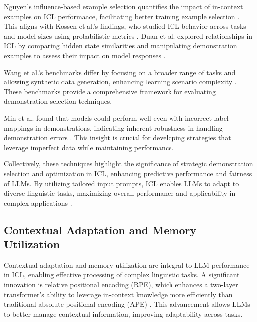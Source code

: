 Nguyen's influence-based example selection quantifies the impact of in-context examples on ICL performance, facilitating better training example selection \cite{nguyen2023incontextexampleselectioninfluences}. This aligns with Kossen et al.'s findings, who studied ICL behavior across tasks and model sizes using probabilistic metrics \cite{kossen2024incontextlearninglearnslabel}. Duan et al. explored relationships in ICL by comparing hidden state similarities and manipulating demonstration examples to assess their impact on model responses \cite{duan2023exploringrelationshipincontextlearning}.

Wang et al.'s benchmarks differ by focusing on a broader range of tasks and allowing synthetic data generation, enhancing learning scenario complexity \cite{wang2024benchmarkinggeneralpurposeincontextlearning}. These benchmarks provide a comprehensive framework for evaluating demonstration selection techniques.

Min et al. found that models could perform well even with incorrect label mappings in demonstrations, indicating inherent robustness in handling demonstration errors \cite{min2022rethinkingroledemonstrationsmakes}. This insight is crucial for developing strategies that leverage imperfect data while maintaining performance.

Collectively, these techniques highlight the significance of strategic demonstration selection and optimization in ICL, enhancing predictive performance and fairness of LLMs. By utilizing tailored input prompts, ICL enables LLMs to adapt to diverse linguistic tasks, maximizing overall performance and applicability in complex applications \cite{peng2024revisitingdemonstrationselectionstrategies,hu2024strategicdemonstrationselectionimproved}.


\subsection{Contextual Adaptation and Memory Utilization} \label{subsec:Contextual Adaptation and Memory Utilization}

Contextual adaptation and memory utilization are integral to LLM performance in ICL, enabling effective processing of complex linguistic tasks. A significant innovation is relative positional encoding (RPE), which enhances a two-layer transformer's ability to leverage in-context knowledge more efficiently than traditional absolute positional encoding (APE) \cite{wang2024understandingknowledgehijackmechanism}. This advancement allows LLMs to better manage contextual information, improving adaptability across tasks.

